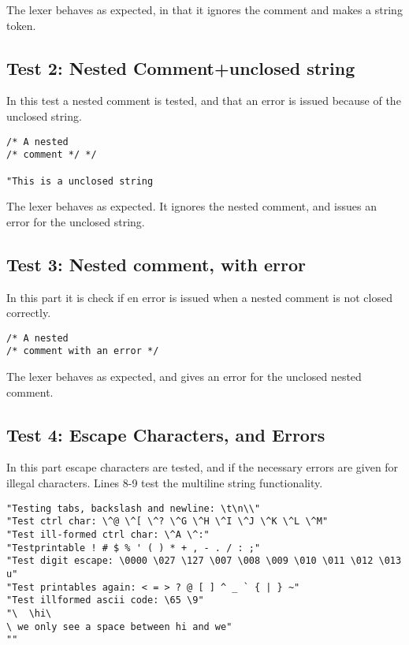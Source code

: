 \documentclass{article}
\begin{document}
The lexer behaves as expected, in that it ignores the comment and makes a string token.

\subsection{Test 2: Nested Comment+unclosed string}
In this test a nested comment is tested, and that an error is issued because of the unclosed string.

\begin{lstlisting}[frame=single]
/* A nested
/* comment */ */

"This is a unclosed string
\end{lstlisting}

The lexer behaves as expected. It ignores the nested comment, and issues an error for the unclosed string.

\subsection{Test 3: Nested comment, with error}
In this part it is check if en error is issued when a nested comment is not closed correctly.

\begin{lstlisting}[frame=single]
/* A nested
/* comment with an error */ 

\end{lstlisting}

The lexer behaves as expected, and gives an error for the unclosed nested comment.

\subsection{Test 4: Escape Characters, and Errors}
In this part escape characters are tested, and if the necessary errors are given for illegal characters.
Lines 8-9 test the multiline string functionality.


\begin{lstlisting}[frame=single]
"Testing tabs, backslash and newline: \t\n\\"
"Test ctrl char: \^@ \^[ \^? \^G \^H \^I \^J \^K \^L \^M"
"Test ill-formed ctrl char: \^A \^:"
"Testprintable ! # $ % ' ( ) * + , - . / : ;"
"Test digit escape: \0000 \027 \127 \007 \008 \009 \010 \011 \012 \013 u"
"Test printables again: < = > ? @ [ ] ^ _ ` { | } ~"
"Test illformed ascii code: \65 \9"
"\	\hi\
\ we only see a space between hi and we"
""
\end{lstlisting}
\end{document}
